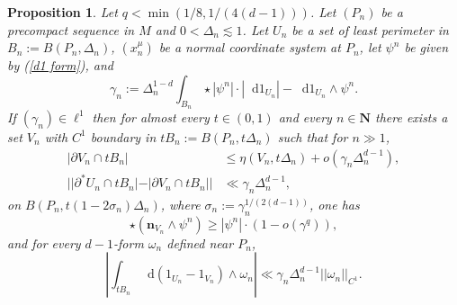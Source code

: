 \documentclass[reqno,12pt,letterpaper]{amsart}
\newcommand{\NN}{\mathbf{N}}
\newcommand*\dif{\mathop{}\!\mathrm{d}}
\newcommand{\normal}{\mathbf n}
\newtheorem{proposition}[theorem]{Proposition}
\theoremstyle{definition}
\numberwithin{equation}{section}
\begin{document}
\begin{proposition}\label{mollifier quant}
Let $q < \min(1/8, 1/(4(d - 1)))$.
Let $(P_n)$ be a precompact sequence in $M$ and $0 < \Delta_n \lesssim 1$.
Let $U_n$ be a set of least perimeter in $B_n := B(P_n, \Delta_n)$, $(x^\mu_n)$ be a normal coordinate system at $P_n$, let $\psi^n$ be given by (\ref{d1 form}), and
$$\gamma_n := \Delta_n^{1 - d} \int_{B_n} \star |\psi^n| \cdot |\dif 1_{U_n}| - \dif 1_{U_n} \wedge \psi^n.$$
If $(\gamma_n) \in \ell^1$ then for almost every $t \in (0, 1)$ and every $n \in \NN$ there exists a set $V_n$ with $C^1$ boundary in $tB_n := B(P_n, t\Delta_n)$ such that for $n \gg 1$,
\begin{align}
|\partial V_n \cap tB_n| &\leq \eta(V_n, t\Delta_n) + o(\gamma_n \Delta_n^{d - 1}), \label{mollifier quant1}\\
||\partial^* U_n \cap tB_n| - |\partial V_n \cap tB_n|| &\ll \gamma_n \Delta_n^{d - 1}, \label{mollifier quant2}
\end{align}
on $B(P_n, t(1 - 2\sigma_n)\Delta_n)$, where $\sigma_n := \gamma_n^{1/(2(d - 1))}$, one has
\begin{equation}
\star(\normal_{V_n} \wedge \psi^n) \geq |\psi^n| \cdot (1 - o(\gamma^q)), \label{mollifier quant4}
\end{equation}
and for every $d-1$-form $\omega_n$ defined near $P_n$,
\begin{equation}\label{mollifier quant3}
\left|\int_{tB_n} \dif(1_{U_n} - 1_{V_n}) \wedge \omega_n\right| \ll \gamma_n \Delta_n^{d - 1} ||\omega_n||_{C^1}.
\end{equation}
\end{proposition}
\end{document}
